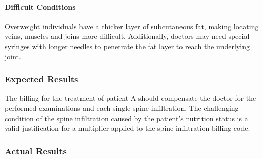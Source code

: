 \paragraph{Difficult Conditions}
Overweight individuals have a thicker layer of subcutaneous fat, making locating veins, muscles and joins more difficult.
Additionally, doctors may need special syringes with longer needles to penetrate the fat layer to reach the underlying joint.


\subsubsection{Expected Results}
The billing for the treatment of patient A should compensate the doctor for the performed examinations and each single spine infiltration.
The challenging condition of the spine infiltration caused by the patient's nutrition status is a valid justification for a multiplier applied to the spine infiltration billing code.


\subsubsection{Actual Results}




